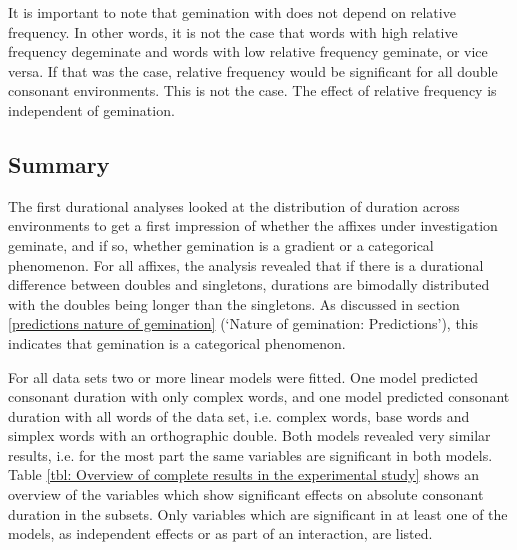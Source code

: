 It is important to note that gemination with  does not depend on relative frequency. In other words, it is not the case that words with high relative frequency degeminate and words with low relative frequency geminate, or vice versa. If that was the case, relative frequency would be significant for all double consonant environments. This is not the case. The effect of relative frequency is independent of gemination. 


\subsection{Summary} \label{discussion experiment}

The first durational analyses looked at the distribution of duration across environments to get a first impression of whether the affixes under investigation geminate, and if so, whether gemination is a gradient or a categorical phenomenon. 
For all affixes,  the analysis revealed that if there is a durational difference between doubles and singletons, durations are bimodally distributed with the doubles being longer than the singletons. As discussed in section \ref{predictions nature of gemination} (`Nature of gemination: Predictions'), this indicates that gemination is a categorical phenomenon.

For all data sets two or more linear models were fitted. One model predicted consonant duration with only complex words, and one model predicted consonant duration with all words of the data set, i.e. complex words, base words and simplex words with an orthographic double. 
Both models revealed very similar results, i.e. for the most part the same variables are significant in both models.
Table \ref{tbl: Overview of complete results in the experimental study} shows an overview of the variables which show significant effects on absolute consonant duration in the subsets. Only variables which are significant in at least one of the models, as independent effects or as part of an interaction, are listed. 



